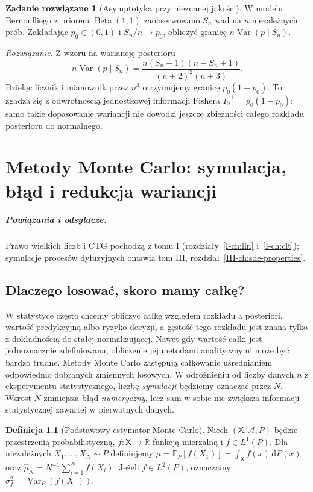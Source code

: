 \documentclass[11pt,a4paper,oneside]{report}
\numberwithin{equation}{chapter}
\theoremstyle{plain}
\theoremstyle{definition}
\newtheorem{definicja}{Definicja}[chapter]
\newtheorem{zadanie}{Zadanie rozwiązane}[chapter]
\theoremstyle{remark}
\newcommand{\R}{\mathbb R}
\newcommand{\E}{\mathbb E}
\newcommand{\Var}{\operatorname{Var}}
\newcommand{\dd}{\mathrm d}
\begin{document}
\begin{zadanie}[Asymptotyka przy nieznanej jakości]
W modelu Bernoulliego z priorem $\operatorname{Beta}(1,1)$
zaobserwowano $S_n$ wad na $n$ niezależnych prób.
Zakładając $p_0\in(0,1)$ i $S_n/n\to p_0$,
obliczyć granicę $n\Var(p\mid S_n)$.
\par\emph{Rozwiązanie.} Z wzoru na wariancję posterioru
\[
 n\Var(p\mid S_n)=
 \frac{n(S_n+1)(n-S_n+1)}{(n+2)^2(n+3)}.
\]
Dzieląc licznik i mianownik przez $n^3$ otrzymujemy
granicę $p_0(1-p_0)$.
To zgadza się z odwrotnością jednostkowej informacji
Fishera $I_0^{-1}=p_0(1-p_0)$; samo takie dopasowanie
wariancji nie dowodzi jeszcze zbieżności całego rozkładu
posterioru do normalnego.
\end{zadanie}

\chapter{Metody Monte Carlo: symulacja, błąd i redukcja wariancji}
\label{ch:monte-carlo}
\paragraph{Powiązania i odsyłacze.} Prawo wielkich liczb i CTG pochodzą z tomu I (rozdziały~\ref{I-ch:lln} i~\ref{I-ch:clt}); symulacje procesów dyfuzyjnych omawia tom III, rozdział~\ref{III-ch:sde-properties}.


\section{Dlaczego losować, skoro mamy całkę?}
W statystyce często chcemy obliczyć całkę względem rozkładu a posteriori,
wartość predykcyjną albo ryzyko decyzji, a gęstość tego rozkładu jest
znana tylko z dokładnością do stałej normalizującej. Nawet gdy wartość
całki jest jednoznacznie zdefiniowana, obliczenie jej metodami
analitycznymi może być bardzo trudne. Metody Monte Carlo zastępują
całkowanie uśrednianiem odpowiednio dobranych zmiennych losowych.
W odróżnieniu od liczby danych $n$ z eksperymentu statystycznego,
liczbę \emph{symulacji} będziemy oznaczać przez $N$. Wzrost $N$ zmniejsza
błąd \emph{numeryczny}, lecz sam w sobie nie zwiększa informacji
statystycznej zawartej w pierwotnych danych.

\begin{definicja}[Podstawowy estymator Monte Carlo]
\label{def:mc-basic}
Niech $(\mathsf X,\mathcal A,P)$ będzie przestrzenią probabilistyczną,
$f\colon\mathsf X\to\R$ funkcją mierzalną i $f\in L^1(P)$.
Dla niezależnych $X_1,\ldots,X_N\sim P$ definiujemy
$\mu=\E_P[f(X_1)]=\int_{\mathsf X}f(x)\,\dd P(x)$ oraz
$\widehat\mu_N=N^{-1}\sum_{i=1}^N f(X_i)$.
Jeżeli $f\in L^2(P)$, oznaczamy
$\sigma_f^2=\Var_P(f(X_1))$.
\end{definicja}
\end{document}
